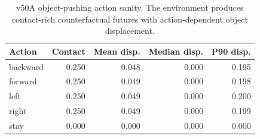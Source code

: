\begin{table}[t]
\centering
\small
\begin{tabular}{lrrrr}
\toprule
Action & Contact & Mean disp. & Median disp. & P90 disp. \\
\midrule
backward & 0.250 & 0.048 & 0.000 & 0.195 \\
forward & 0.250 & 0.049 & 0.000 & 0.198 \\
left & 0.250 & 0.049 & 0.000 & 0.200 \\
right & 0.250 & 0.049 & 0.000 & 0.199 \\
stay & 0.000 & 0.000 & 0.000 & 0.000 \\
\bottomrule
\end{tabular}
\caption{v50A object-pushing action sanity. The environment produces contact-rich counterfactual futures with action-dependent object displacement.}
\label{tab:v50a_object_pushing_action_sanity}
\end{table}

